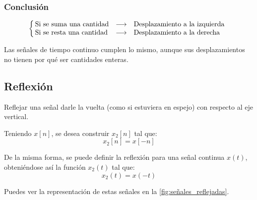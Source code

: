 \documentclass[a4paper]{book}
\begin{document}
\subsubsection{Conclusión}
\[\left\{ \begin{array}{l c l}
		\! \! \textrm{Si se suma una cantidad}  & \longrightarrow & \textrm{Desplazamiento a la izquierda} \\
		\! \! \textrm{Si se resta una cantidad} & \longrightarrow & \textrm{Desplazamiento a la derecha}
	\end{array} \right.
\]

\begin{nota}
	Las señales de tiempo continuo cumplen lo mismo, aunque sus desplazamientos no tienen por qué ser cantidades enteras.
\end{nota}

\subsection{Reflexión}

Reflejar una señal darle la vuelta (como si estuviera en espejo) con respecto al eje vertical.

\begin{ejemplo}
	Teniendo $x[n]$, se desea construir $x_2[n]$ tal que: \[x_2[n] = x[-n] \]
\end{ejemplo}

\begin{ejemplo}
	De la misma forma, se puede definir la reflexión para una señal continua $x(t)$, obteniéndose así la función $x_2(t)$ tal que: \[x_2(t) = x(-t)\]
\end{ejemplo}

Puedes ver la representación de estas señales en la \autoref{fig:señales_reflejadas}.
\end{document}
